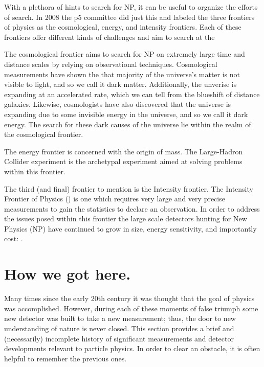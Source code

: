 With a plethora of hints to search for NP, it can be useful to organize the efforts of search.
In 2008 the p5 committee did just this and labeled the three frontiers of physics as the cosmological, energy, and intensity frontiers.
Each of these frontiers offer different kinds of challenges and aim to search at the

The cosmological frontier aims to search for NP on extremely large time and distance scales by relying on observational techniques.
Cosmological measurements have shown the that majority of the universe's matter is not visible to light, and so we call it dark matter.
Additionally, the unverise is expanding at an accelerated rate, which we can tell from the blueshift of distance galaxies.
Likewise, cosmologists have also discovered that the universe is expanding due to some invisible energy in the universe, and so we call it dark energy.
The search for these dark causes of the universe lie within the realm of the cosmological frontier.

The energy frontier is concerned with the origin of mass.
The Large-Hadron Collider experiment is the archetypal experiment aimed at solving problems within this frontier.

The third (and final) frontier to mention is the Intensity frontier.
The Intensity Frontier of Physics (\citep{intensityfrontier2012_Hewett}) is one which requires very large and very precise measurements to gain the statistics to declare an observation.
In order to address the issues posed within this frontier the large scale detectors hunting for New Physics (NP) have continued to grow in size, energy sensitivity, and importantly cost: \citep{Juno:2022103927}.


\section{How we got here.}

Many times since the early 20th century it was thought that the goal of physics was accomplished.
However, during each of these moments of false triumph some new detector was built to take a new measurement; thus, the door to new understanding of nature is never closed.
This section provides a brief and (necessarily) incomplete history of significant measurements and detector developments relevant to particle physics.
In order to clear an obstacle, it is often helpful to remember the previous ones.


